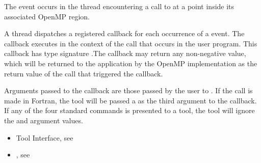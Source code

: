 \linenumbers

\events

The  event occurs in the thread encountering a call
to  at a point inside its associated OpenMP region.

\tools

A thread dispatches a registered
 callback for each occurrence of a
 event.  The callback executes in the context of the
call that occurs in the user program.  This callback has type
signature .The callback may return
any non-negative value, which will be returned to the application by
the OpenMP implementation as the return value of the
 call that triggered the callback.


Arguments passed to the callback are those passed by the user to
. If the call is made in Fortran, the tool
will be passed a  as the third argument to the callback. If
any of the four standard commands is presented to a tool, the tool
will ignore the  and  argument values.



\crossreferences
\begin{itemize}
\item Tool Interface, see
\item {}, see 
\end{itemize}

